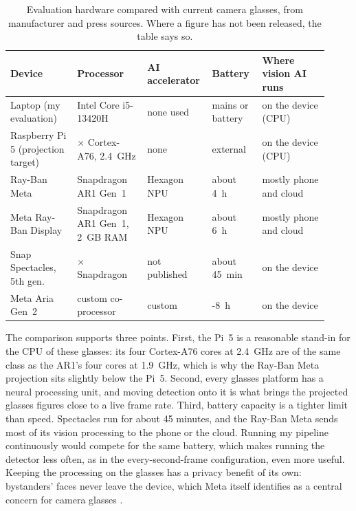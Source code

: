 \begin{table}[htbp]
\begin{singlespace}
\centering
\caption{Evaluation hardware compared with current camera glasses, from manufacturer and
press sources. Where a figure has not been released, the table says so.}
\label{tab:glasses}
\renewcommand{\arraystretch}{1.3}
\small
\setlength{\tabcolsep}{4pt}
\begin{tabular}{@{}>{\raggedright\arraybackslash}p{0.20\linewidth}
                 >{\raggedright\arraybackslash}p{0.21\linewidth}
                 >{\raggedright\arraybackslash}p{0.16\linewidth}
                 >{\raggedright\arraybackslash}p{0.15\linewidth}
                 >{\raggedright\arraybackslash}p{0.20\linewidth}@{}}
\toprule
\textbf{Device} & \textbf{Processor} & \textbf{AI accelerator} & \textbf{Battery} &
\textbf{Where vision AI runs} \\
\midrule
Laptop (my evaluation) & Intel Core i5-13420H & none used & mains or battery & on the device (CPU) \\
Raspberry Pi 5 (projection target) & 4$\times$ Cortex-A76, 2.4~GHz & none & external & on the device (CPU) \\
Ray-Ban Meta \cite{qcom_ar1} & Snapdragon AR1 Gen~1 & Hexagon NPU & about 4~h & mostly phone and cloud \\
Meta Ray-Ban Display \cite{gsmarena_display} & Snapdragon AR1 Gen~1, 2~GB RAM & Hexagon NPU & about 6~h & mostly phone and cloud \\
Snap Spectacles, 5th gen.\ \cite{spectacles5} & 2$\times$ Snapdragon & not published & about 45~min & on the device \\
Meta Aria Gen~2 \cite{aria2} & custom co-processor & custom & 6-8~h & on the device \\
\bottomrule
\end{tabular}
\end{singlespace}
\end{table}

The comparison supports three points. First, the Pi~5 is a reasonable stand-in for the CPU
of these glasses: its four Cortex-A76 cores at 2.4~GHz are of the same class as the AR1's
four cores at 1.9~GHz, which is why the Ray-Ban Meta projection sits slightly below the
Pi~5. Second, every glasses platform has a neural processing unit, and moving detection onto
it is what brings the projected glasses figures close to a live frame rate. Third, battery capacity is a tighter limit
than speed. Spectacles run for about 45 minutes, and the Ray-Ban Meta sends most of its
vision processing to the phone or the cloud. Running my pipeline continuously would compete for the
same battery, which makes running the detector less often, as in the every-second-frame
configuration, even more useful.
Keeping the processing on the glasses has a privacy benefit of its own: bystanders' faces
never leave the device, which Meta itself identifies as a central concern for camera
glasses \cite{meta_bystander}.

